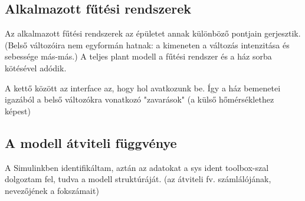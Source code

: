 

\subsection{Alkalmazott fűtési rendszerek}

Az alkalmazott fűtési rendszerek az épületet annak különböző pontjain gerjesztik. (Belső változóira nem egyformán hatnak: a kimeneten a változás intenzitása és sebessége más-más.) A teljes plant modell a fűtési rendszer és a ház sorba kötésével adódik.

A kettő között az interface az, hogy hol avatkozunk be. Így a ház bemenetei igazából a belső változókra vonatkozó "zavarások" (a külső hőmérséklethez képest)

\subsection{A modell átviteli függvénye}
A Simulinkben identifikáltam, aztán az adatokat a sys ident toolbox-szal dolgoztam fel, tudva a modell struktúráját. (az átviteli fv. számlálójának, nevezőjének a fokszámait)

\pagebreak
